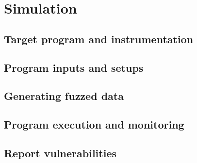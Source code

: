 \chapter{Simulation}
\section{Target program and instrumentation}
\section{Program inputs and setups}
\section{Generating fuzzed data}
\section{Program execution and monitoring}
\section{Report vulnerabilities}

